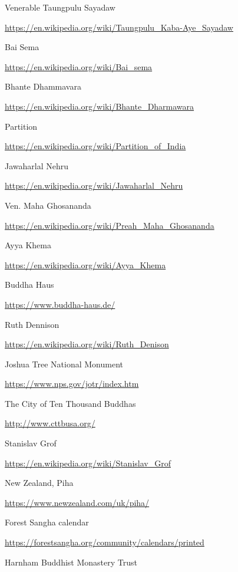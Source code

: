 \begin{thebibliography}{9}
 Venerable Taungpulu Sayadaw

  {\urlsize \url{https://en.wikipedia.org/wiki/Taungpulu_Kaba-Aye_Sayadaw}}

 Bai Sema

  {\urlsize \url{https://en.wikipedia.org/wiki/Bai_sema}}

 Bhante Dhammavara

  {\urlsize \url{https://en.wikipedia.org/wiki/Bhante_Dharmawara}}

 Partition

  {\urlsize \url{https://en.wikipedia.org/wiki/Partition_of_India}}

 Jawaharlal Nehru

  {\urlsize \url{https://en.wikipedia.org/wiki/Jawaharlal_Nehru}}

 Ven. Maha Ghosananda

  {\urlsize \url{https://en.wikipedia.org/wiki/Preah_Maha_Ghosananda}}

 Ayya Khema

  {\urlsize \url{https://en.wikipedia.org/wiki/Ayya_Khema}}

 Buddha Haus

  {\urlsize \url{https://www.buddha-haus.de/}}

 Ruth Dennison

  {\urlsize \url{https://en.wikipedia.org/wiki/Ruth_Denison}}

 Joshua Tree National Monument

  {\urlsize \url{https://www.nps.gov/jotr/index.htm}}

 The City of Ten Thousand Buddhas

  {\urlsize \url{http://www.cttbusa.org/}}

 Stanislav Grof

  {\urlsize \url{https://en.wikipedia.org/wiki/Stanislav_Grof}}

 New Zealand, Piha

  {\urlsize \url{https://www.newzealand.com/uk/piha/}}

 Forest Sangha calendar

  {\urlsize \url{https://forestsangha.org/community/calendars/printed}}

 Harnham Buddhist Monastery Trust


\end{thebibliography}
